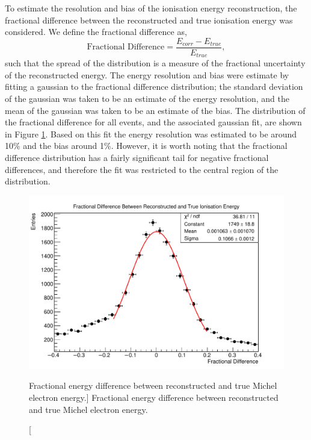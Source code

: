 To estimate the resolution and bias of the ionisation energy reconstruction, the
fractional difference between the reconstructed and true ionisation energy was
considered. We define the fractional difference as,
\begin{equation*}
	\mbox{Fractional Difference} = \frac{E_{corr} - E_{true}}{E_{true}},
\end{equation*}
such that the spread of the distribution is a measure of the fractional
uncertainty of the reconstructed energy. The energy resolution and bias were
estimate by fitting a gaussian to the fractional difference distribution; the
standard deviation of the gaussian was taken to be an estimate of the energy
resolution, and the mean of the gaussian was taken to be an estimate of the
bias. The distribution of the fractional difference for all events, and the 
associated gaussian fit, are shown in Figure \ref{fig:frac_diff_ion}. Based on
this fit the energy resolution was estimated to be around 10\% and the bias 
around 1\%. However, it is worth noting that the fractional difference
distribution has a fairly significant tail for negative fractional differences,
and therefore the fit was restricted to the central region of the distribution.
\begin{figure}
	\centering
	\includegraphics[width=\textwidth]{figures/frac_diff_ion.pdf}
	\caption
	[Fractional energy difference between reconstructed and true Michel electron
	energy.]
	{Fractional energy difference between reconstructed and true Michel electron
	energy.}
	\label{fig:frac_diff_ion}
\end{figure}

